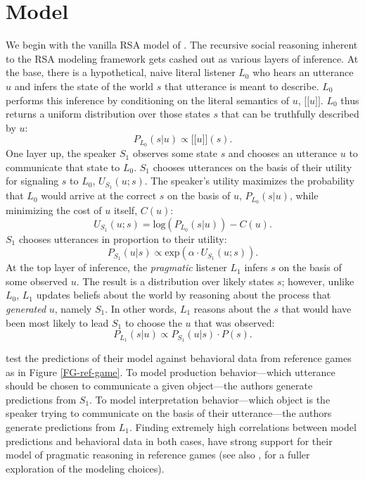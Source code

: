 \documentclass[10pt,a4paper]{article}
\newcommand{\sem}[1]{\mbox{$[\![$#1$]\!]$}}
\begin{document}
\section{Model}

We begin with the vanilla RSA model of . The recursive social reasoning inherent to the RSA modeling framework gets cashed out as various layers of inference. At the base, there is a hypothetical, naive literal listener $L_0$ who hears an utterance $u$ and infers the state of the world $s$ that utterance is meant to describe. $L_0$ performs this inference by conditioning on the literal semantics of $u$, \sem{$u$}. $L_0$ thus returns a uniform distribution over those states $s$ that can be truthfully described by $u$:
$$P_{L_{0}}(s|u) \propto \sem{$u$}(s).$$
One layer up, the speaker $S_1$ observes some state $s$ and chooses an utterance $u$ to communicate that state to $L_0$. $S_1$ chooses utterances on the basis of their utility for signaling $s$ to $L_0$, $U_{S_1}(u;s)$. The speaker's utility maximizes the probability that $L_0$ would arrive at the correct $s$ on the basis of $u$, $P_{L_{0}}(s|u)$, while minimizing the cost of $u$ itself, $C(u)$:
$$U_{S_{1}}(u;s) = \textrm{log}(P_{L_{0}}(s|u)) - C(u).$$
$S_1$ chooses utterances in proportion to their utility:
$$P_{S_{1}} (u|s) \propto   \textrm{exp}(\alpha \cdot U_{S_{1}} (u;s)).$$
At the top layer of inference, the \emph{pragmatic} listener $L_1$ infers $s$ on the basis of some observed $u$. The result is a distribution over likely states $s$; however, unlike $L_0$, $L_1$ updates beliefs about the world by reasoning about the process that \emph{generated} $u$, namely $S_1$. In other words, $L_1$ reasons about the $s$ that would have been most likely to lead $S_1$ to choose the  $u$ that was observed:
$$P_{L_{1}}(s|u) \propto P_{S_{1}}(u|s) \cdot P(s).$$

 test the predictions of their model against behavioral data from reference games as in Figure \ref{FG-ref-game}. To model production behavior---which utterance should be chosen to communicate a given object---the authors generate predictions from $S_1$. To model interpretation behavior---which object is the speaker trying to communicate on the basis of their utterance---the authors generate predictions from $L_1$. Finding extremely high correlations between model predictions and behavioral data in both cases, \citeauthor{frankgoodman2012} have strong support for their model of pragmatic reasoning in reference games (see also , for a fuller exploration of the modeling choices).
\end{document}
